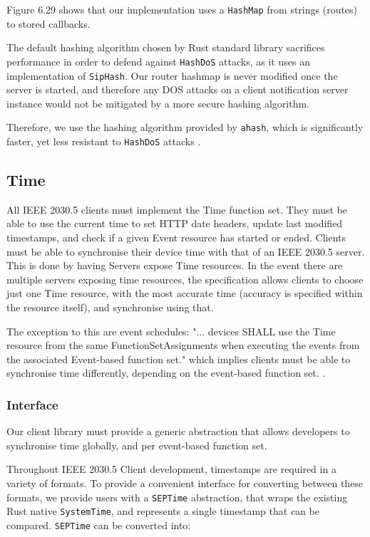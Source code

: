 Figure 6.29 shows that our implementation uses a \texttt{HashMap} from strings (routes) to stored callbacks. 

The default hashing algorithm chosen by Rust standard library sacrifices performance in order to defend against \texttt{HashDoS} attacks, as it uses an implementation of \texttt{SipHash}. Our router hashmap is never modified once the server is started, and therefore any DOS attacks on a client notification server instance would not be mitigated by a more secure hashing algorithm.

Therefore, we use the hashing algorithm provided by \texttt{ahash}, which is significantly faster, yet less resistant to \texttt{HashDoS} attacks \cite{ahash} \cite{hashbrown}.

\subsection{Time}
All IEEE 2030.5 clients must implement the Time function set. They must be able to use the current time to set HTTP date headers, update last modified timestamps, and check if a given Event resource has started or ended. Clients must be able to synchronise their device time with that of an IEEE 2030.5 server. This is done by having Servers expose Time resources. In the event there are multiple servers exposing time resources, the specification allows clients to choose just one Time resource, with the most accurate time (accuracy is specified within the resource itself), and synchronise using that.

The exception to this are event schedules: "... devices SHALL use the Time resource from the same FunctionSetAssignments when executing the events from the associated Event-based function set." which implies clients must be able to synchronise time differently, depending on the event-based function set. \cite{IEEE2030.5}.

\subsubsection{Interface}
Our client library must provide a generic abstraction that allows developers to synchronise time globally, and per event-based function set.

Throughout IEEE 2030.5 Client development, timestamps are required in a variety of formats. To provide a convenient interface for converting between these formats, we provide users with a \texttt{SEPTime} abstraction, that wraps the existing Rust native \texttt{SystemTime}, and represents a single timestamp that can be compared. \texttt{SEPTime} can be converted into:

